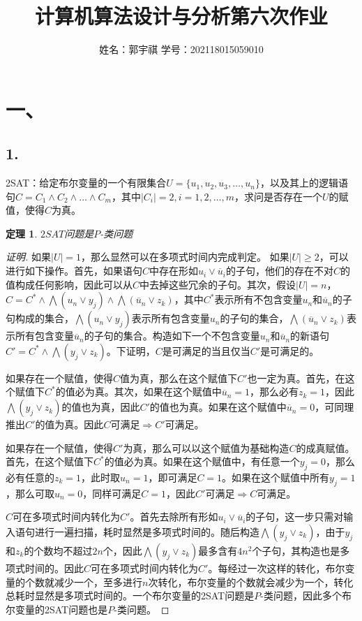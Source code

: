 \documentclass[a4paper]{article}
\newtheorem{theorem}{定理}
\begin{document}
 
\title{计算机算法设计与分析第六次作业}
\author{姓名：郭宇祺 \quad 学号：202118015059010}
\date{}
\maketitle
\normalsize
\section*{一、}
\subsection*{1.}
2SAT：给定布尔变量的一个有限集合$U=\{u_1, u_2, u_3, \dots, u_n\}$，以及其上的逻辑语句$C=C_1 \wedge C_2 \wedge \dots \wedge C_m$，其中$\left\lvert C_i\right\rvert=2, i=1, 2, \dots, m$，求问是否存在一个$U$的赋值，使得$C$为真。

\begin{theorem}
  $2SAT$问题是$P$-类问题
\end{theorem}
\begin{proof}[证明]
  如果$\left\lvert U\right\rvert=1$，那么显然可以在多项式时间内完成判定。
  如果$\left\lvert U\right\rvert \geq 2$，可以进行如下操作。首先，如果语句$C$中存在形如$u_i \vee \overline{u}_i$的子句，他们的存在不对$C$的值构成任何影响，因此可以从$C$中去掉这些冗余的子句。其次，假设$\left\lvert U\right\rvert=n$，$C=C^* \wedge \bigwedge (u_n \vee y_j) \wedge \bigwedge (\overline{u}_n \vee z_k)$，其中$C^*$表示所有不包含变量$u_n$和$\overline{u}_n$的子句构成的集合，$\bigwedge (u_n \vee y_j)$表示所有包含变量$u_n$的子句的集合，$\bigwedge (\overline{u}_n \vee z_k)$表示所有包含变量$\overline{u}_n$的子句的集合。构造如下一个不包含变量$u_n$和$\overline{u}_n$的新语句$C'=C^* \wedge \bigwedge (y_j \vee z_k)$。下证明，$C$是可满足的当且仅当$C'$是可满足的。

  如果存在一个赋值，使得$C$值为真，那么在这个赋值下$C'$也一定为真。首先，在这个赋值下$C^*$的值必为真。其次，如果在这个赋值中$\overline{u}_n=1$，那么必有$z_k=1$，因此$\bigwedge (y_j \vee z_k)$的值也为真，因此$C'$的值也为真。如果在这个赋值中$\overline{u}_n=0$，可同理推出$C'$的值为真。因此$C\text{可满足} \Rightarrow C'\text{可满足}$。

  如果存在一个赋值，使得$C'$为真，那么可以以这个赋值为基础构造$C$的成真赋值。首先，在这个赋值下$C^*$的值必为真。如果在这个赋值中，有任意一个$y_j=0$，那么必有任意的$z_k=1$，此时取$u_n=1$，即可满足$C=1$。如果在这个赋值中所有$y_j=1$，那么可取$u_n=0$，同样可满足$C=1$，因此$C'\text{可满足} \Rightarrow C\text{可满足}$。

  $C$可在多项式时间内转化为$C'$。首先去除所有形如$u_i \vee \overline{u}_i$的子句，这一步只需对输入语句进行一遍扫描，耗时显然是多项式时间的。随后构造$\bigwedge (y_j \vee z_k)$，由于$y_j$和$z_k$的个数均不超过$2n$个，因此$\bigwedge (y_j \vee z_k)$最多含有$4n^2$个子句，其构造也是多项式时间的。因此$C$可在多项式时间内转化为$C'$。每经过一次这样的转化，布尔变量的个数就减少一个，至多进行$n$次转化，布尔变量的个数就会减少为一个，转化总耗时显然是多项式时间的。一个布尔变量的2SAT问题是$P$-类问题，因此多个布尔变量的2SAT问题也是$P$-类问题。
\end{proof}
\end{document}
